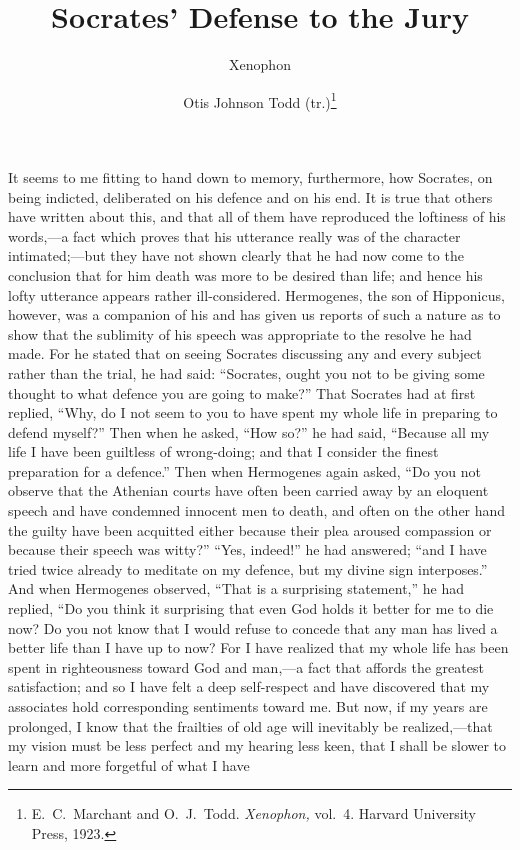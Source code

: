 \documentclass[12pt]{article}
\title{Socrates' Defense to the Jury}
\author{Xenophon \and Otis Johnson Todd (tr.)\footnote{E.~C.~Marchant and
O.~J.~Todd. \textit{Xenophon,} vol.~4. Harvard University Press, 1923.}}
\date{}
\begin{document}
\maketitle

\noindent It seems to me fitting to hand down to memory, furthermore, how
Socrates, on being indicted, deliberated on his defence and on his end. It is
true that others have written about this, and that all of them have reproduced
the loftiness of his words,---a fact which proves that his utterance really was
of the character intimated;---but they have not shown clearly that he had now
come to the conclusion that for him death was more to be desired than life; and
hence his lofty utterance appears rather ill-considered. Hermogenes, the son of
Hipponicus, however, was a companion of his and has given us reports of such a
nature as to show that the sublimity of his speech was appropriate to the
resolve he had made. For he stated that on seeing Socrates discussing any and
every subject rather than the trial, he had said: ``Socrates, ought you not to
be giving some thought to what defence you are going to make?'' That Socrates
had at first replied, ``Why, do I not seem to you to have spent my whole life
in preparing to defend myself?'' Then when he asked, ``How so?'' he had said,
``Because all my life I have been guiltless of wrong-doing; and that I consider
the finest preparation for a defence.'' Then when Hermogenes again asked, ``Do
you not observe that the Athenian courts have often been carried away by an
eloquent speech and have condemned innocent men to death, and often on the
other hand the guilty have been acquitted either because their plea aroused
compassion or because their speech was witty?'' ``Yes, indeed!'' he had
answered; ``and I have tried twice already to meditate on my defence, but my
divine sign interposes.'' And when Hermogenes observed, ``That is a surprising
statement,'' he had replied, ``Do you think it surprising that even God holds
it better for me to die now? Do you not know that I would refuse to concede
that any man has lived a better life than I have up to now? For I have realized
that my whole life has been spent in righteousness toward God and man,---a fact
that affords the greatest satisfaction; and so I have felt a deep self-respect
and have discovered that my associates hold corresponding sentiments toward me.
But now, if my years are prolonged, I know that the frailties of old age will
inevitably be realized,---that my vision must be less perfect and my hearing
less keen, that I shall be slower to learn and more forgetful of what I have
\end{document}

